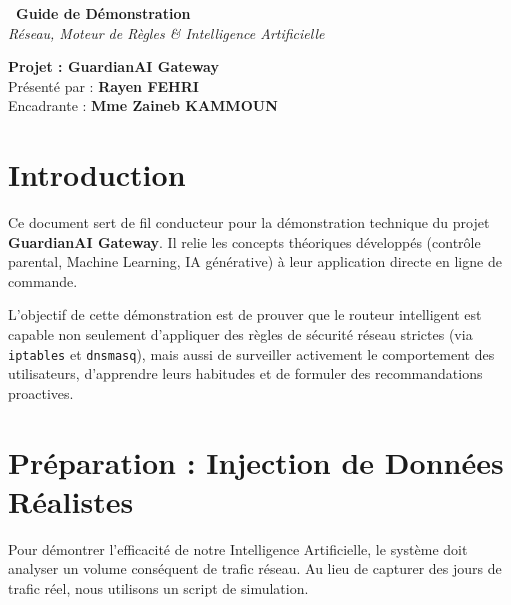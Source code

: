 \documentclass[11pt,a4paper]{article}
\begin{document}
\thispagestyle{empty}
\begin{center}
\vspace*{3cm}
\begin{tcolorbox}[
  colback=lightblue!35, colframe=blueTN, arc=6pt, boxrule=1.2pt,
  width=0.9\textwidth, halign=center, valign=center,
  top=16pt, bottom=16pt, left=10pt, right=10pt
]
{\fontsize{22pt}{24pt}\selectfont\textbf{\faPlayCircle\ Guide de Démonstration}}\\[10pt]
{\large\textit{Réseau, Moteur de Règles \& Intelligence Artificielle}}
\end{tcolorbox}
\vspace{1cm}
{\Large\textbf{Projet : GuardianAI Gateway}}\\[0.5cm]
{\large Présenté par : \textbf{Rayen FEHRI}}\\
{\large Encadrante : \textbf{Mme Zaineb KAMMOUN}}
\end{center}
\vspace{2cm}

\section*{Introduction}

Ce document sert de fil conducteur pour la démonstration technique du projet \textbf{GuardianAI Gateway}. Il relie les concepts théoriques développés (contrôle parental, Machine Learning, IA générative) à leur application directe en ligne de commande.

L'objectif de cette démonstration est de prouver que le routeur intelligent est capable non seulement d'appliquer des règles de sécurité réseau strictes (via \texttt{iptables} et \texttt{dnsmasq}), mais aussi de surveiller activement le comportement des utilisateurs, d'apprendre leurs habitudes et de formuler des recommandations proactives.

\section{Préparation : Injection de Données Réalistes}

Pour démontrer l'efficacité de notre Intelligence Artificielle, le système doit analyser un volume conséquent de trafic réseau. Au lieu de capturer des jours de trafic réel, nous utilisons un script de simulation.
\end{document}
